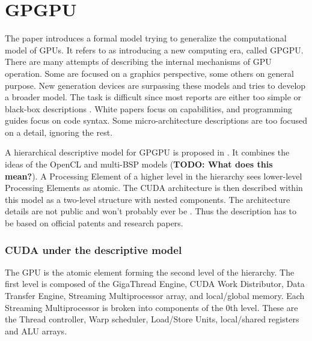 
\section{GPGPU} \label{sec:gpgpu}


The paper \cite{Hu:2016:CLG:2891449.2873053} introduces a formal model trying to generalize the computational model of GPUs.
It refers to \cite{nickolls2010gpu} as introducing a new computing era, called GPGPU.
There are many attempts of describing the internal mechanisms of GPU operation.
Some are focused on a graphics perspective, some others on general purpose.
New generation devices are surpassing these models and \cite{Hu:2016:CLG:2891449.2873053} tries to develop a broader model.
The task is difficult since most reports are either too simple or black-box descriptions \cite{Hu:2016:CLG:2891449.2873053}.
White papers focus on capabilities, and programming guides focus on code syntax.
Some micro-architecture descriptions are too focused on a detail, ignoring the rest.

A hierarchical descriptive model for GPGPU is proposed in \cite{Hu:2016:CLG:2891449.2873053}.
It combines the ideas of the OpenCL and multi-BSP models (\textbf{TODO: What does this mean?}).
A Processing Element of a higher level in the hierarchy sees lower-level Processing Elements as atomic.
The CUDA architecture is then described within this model as a two-level structure with nested components.
The architecture details are not public and won't probably ever be \cite{voicu:fermi}.
Thus the description has to be based on official patents and research papers.

\subsubsection{CUDA under the descriptive model}
The GPU is the atomic element forming the second level of the hierarchy.
The first level is composed of the GigaThread Engine, CUDA Work Distributor, Data Transfer Engine, Streaming Multiprocessor array, and local/global memory.
Each Streaming Multiprocessor is broken into components of the 0th level.
These are the Thread controller, Warp scheduler, Load/Store Units, local/shared registers and ALU arrays.

